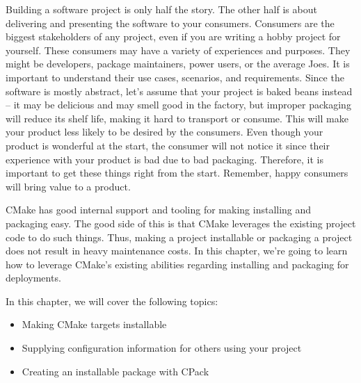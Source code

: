 Building a software project is only half the story. The other half is about delivering and presenting the software to your consumers. Consumers are the biggest stakeholders of any project, even if you are writing a hobby project for yourself. These consumers may have a variety of experiences and purposes. They might be developers, package maintainers, power users, or the average Joes. It is important to understand their use cases, scenarios, and requirements. Since the software is mostly abstract, let's assume that your project is baked beans instead – it may be delicious and may smell good in the factory, but improper packaging will reduce its shelf life, making it hard to transport or consume. This will make your product less likely to be desired by the consumers. Even though your product is wonderful at the start, the consumer will not notice it since their experience with your product is bad due to bad packaging. Therefore, it is important to get these things right from the start. Remember, happy consumers will bring value to a product.

CMake has good internal support and tooling for making installing and packaging easy. The good side of this is that CMake leverages the existing project code to do such things. Thus, making a project installable or packaging a project does not result in heavy maintenance costs. In this chapter, we're going to learn how to leverage CMake's existing abilities regarding installing and packaging for deployments.

In this chapter, we will cover the following topics:

\begin{itemize}
\item 
Making CMake targets installable

\item 
Supplying configuration information for others using your project

\item 
Creating an installable package with CPack
\end{itemize}
